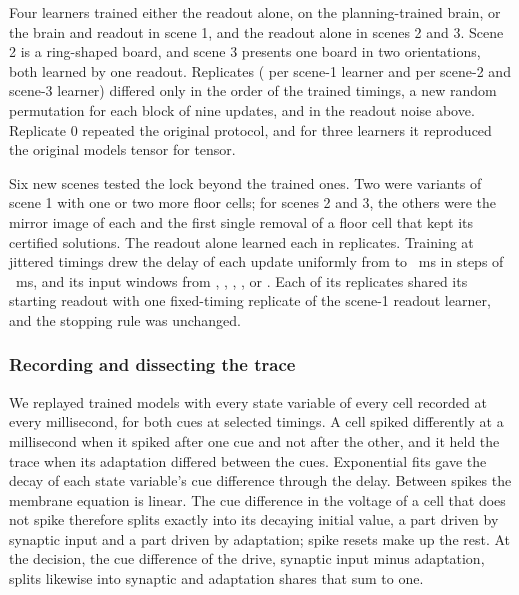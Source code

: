 Four learners trained either the readout alone, on the planning-trained brain, or the brain and readout in scene 1, and the
readout alone in scenes 2 and 3. Scene 2 is a ring-shaped board, and scene 3 presents one board in two orientations, both learned
by one readout. Replicates ( per scene-1 learner and  per scene-2 and scene-3 learner) differed only in the
order of the trained timings, a new random permutation for each block of nine updates, and in the readout noise above.
Replicate 0 repeated the original protocol, and for three learners it reproduced the original models tensor for tensor.

Six new scenes tested the lock beyond the trained ones. Two were variants of scene 1 with one or two more floor cells; for
scenes 2 and 3, the others were the mirror image of each and the first single removal of a floor cell that kept its certified
solutions. The readout alone learned each in  replicates. Training at jittered timings drew the delay of each update uniformly from
 to ~ms in steps of ~ms, and its input windows from , , ,
,  or . Each of its replicates shared its starting readout with one fixed-timing replicate of the
scene-1 readout learner, and the stopping rule was unchanged.

\subsubsection{Recording and dissecting the trace}

We replayed trained models with every state variable of every cell recorded at every millisecond, for both cues at
selected timings. A cell spiked differently at a millisecond when it spiked after one cue and not after the other, and it held the
trace when its adaptation differed between the cues. Exponential fits gave the decay of each state variable's cue difference
through the delay. Between spikes the membrane equation is linear. The cue difference in the voltage of a cell that does not
spike therefore splits exactly into its decaying initial value, a part driven by synaptic input and a part driven by
adaptation; spike resets make up the rest. At the decision, the cue difference of the drive, synaptic input minus adaptation, splits likewise
into synaptic and adaptation shares that sum to one.


